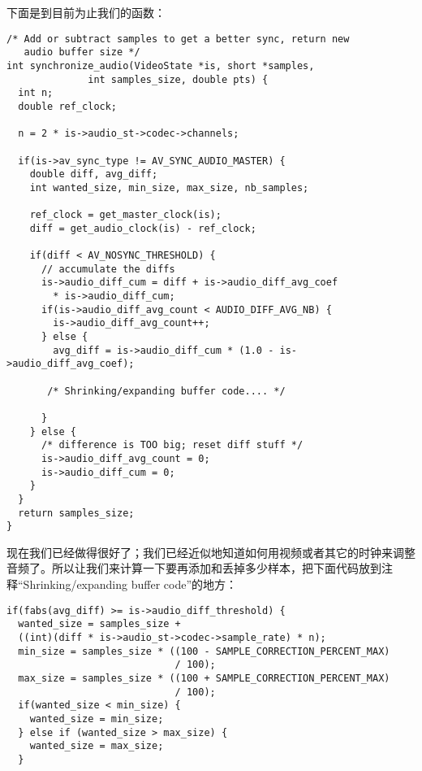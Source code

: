 
下面是到目前为止我们的函数：
\begin{lstlisting}
/* Add or subtract samples to get a better sync, return new
   audio buffer size */
int synchronize_audio(VideoState *is, short *samples,
              int samples_size, double pts) {
  int n;
  double ref_clock;

  n = 2 * is->audio_st->codec->channels;

  if(is->av_sync_type != AV_SYNC_AUDIO_MASTER) {
    double diff, avg_diff;
    int wanted_size, min_size, max_size, nb_samples;

    ref_clock = get_master_clock(is);
    diff = get_audio_clock(is) - ref_clock;

    if(diff < AV_NOSYNC_THRESHOLD) {
      // accumulate the diffs
      is->audio_diff_cum = diff + is->audio_diff_avg_coef
        * is->audio_diff_cum;
      if(is->audio_diff_avg_count < AUDIO_DIFF_AVG_NB) {
        is->audio_diff_avg_count++;
      } else {
        avg_diff = is->audio_diff_cum * (1.0 - is->audio_diff_avg_coef);

       /* Shrinking/expanding buffer code.... */

      }
    } else {
      /* difference is TOO big; reset diff stuff */
      is->audio_diff_avg_count = 0;
      is->audio_diff_cum = 0;
    }
  }
  return samples_size;
}
\end{lstlisting}

现在我们已经做得很好了；我们已经近似地知道如何用视频或者其它的时钟来调整音频了。所以让我们来计算一下要再添加和丢掉多少样本，把下面代码放到注释“Shrinking/expanding buffer code”的地方：

\begin{lstlisting}
if(fabs(avg_diff) >= is->audio_diff_threshold) {
  wanted_size = samples_size +
  ((int)(diff * is->audio_st->codec->sample_rate) * n);
  min_size = samples_size * ((100 - SAMPLE_CORRECTION_PERCENT_MAX)
                             / 100);
  max_size = samples_size * ((100 + SAMPLE_CORRECTION_PERCENT_MAX)
                             / 100);
  if(wanted_size < min_size) {
    wanted_size = min_size;
  } else if (wanted_size > max_size) {
    wanted_size = max_size;
  }
\end{lstlisting}

